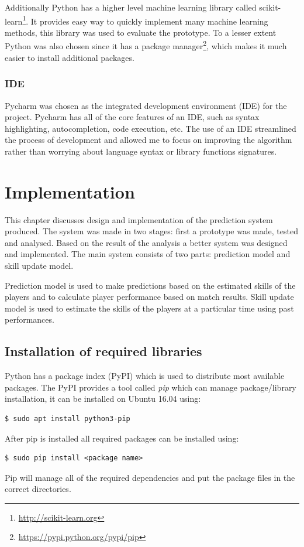\documentclass[12pt,a4paper]{book}
\begin{document}
Additionally Python has a higher level machine learning library called scikit-learn\footnote{\url{http://scikit-learn.org}}.
It provides easy way to quickly implement many machine learning methods, this library was used to evaluate the prototype.
To a lesser extent Python was also chosen since it has a package manager\footnote{\url{https://pypi.python.org/pypi/pip}}, which makes it much easier to install additional packages.

\subsection{IDE}
Pycharm was chosen as the integrated development environment (IDE) for the project.
Pycharm has all of the core features of an IDE, such as syntax highlighting, autocompletion, code execution, etc.
The use of an IDE streamlined the process of development and allowed me to focus on improving the algorithm rather than worrying about language syntax or library functions signatures. 


\chapter{Implementation}
This chapter discusses design and implementation of the prediction system produced.
The system was made in two stages: first a prototype was made, tested and analysed.
Based on the result of the analysis a better system was designed and implemented.
The main system consists of two parts: prediction model and skill update model.

Prediction model is used to make predictions based on the estimated skills of the players and to calculate player performance based on match results.
Skill update model is used to estimate the skills of the players at a particular time using past performances.
\section{Installation of required libraries}
Python has a package index (PyPI) which is used to distribute most available packages.
The PyPI provides a tool called \emph{pip} which can manage package/library installation, it can be installed on Ubuntu 16.04 using:
\begin{verbatim}
$ sudo apt install python3-pip
\end{verbatim}
After pip is installed all required packages can be installed using:
\begin{verbatim}
$ sudo pip install <package name>
\end{verbatim}
Pip will manage all of the required dependencies and put the package files in the correct directories.
\end{document}
